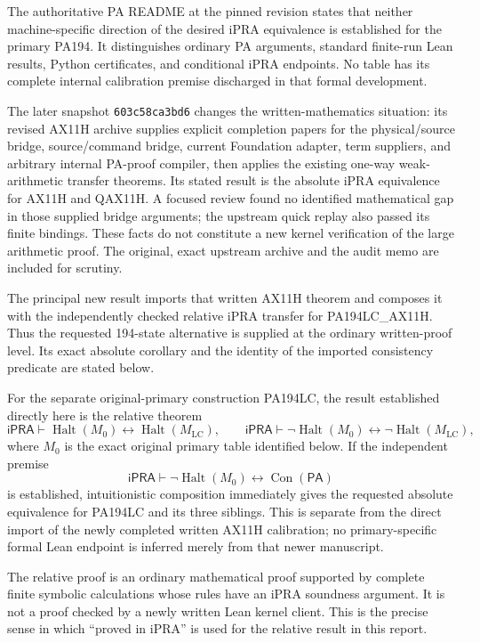 \documentclass[11pt,a4paper]{article}
\newcommand{\ipra}{\mathsf{iPRA}}
\newcommand{\pa}{\mathsf{PA}}
\newcommand{\Con}{\operatorname{Con}}
\newcommand{\Halt}{\operatorname{Halt}}
\newcommand{\ML}{M_{\mathrm{LC}}}
\begin{document}
The authoritative PA README at the pinned revision states that neither
machine-specific direction of the desired iPRA equivalence is established
for the primary PA194. It distinguishes ordinary PA arguments, standard
finite-run Lean results, Python certificates, and conditional iPRA
endpoints. No table has its complete internal calibration premise
discharged in that formal development.\cite{pa-readme}

The later snapshot \texttt{603c58ca3bd6} changes the written-mathematics
situation: its revised AX11H archive supplies explicit completion papers
for the physical/source bridge, source/command bridge, current Foundation
adapter, term suppliers, and arbitrary internal PA-proof compiler, then
applies the existing one-way weak-arithmetic transfer theorems.
Its stated result is the absolute iPRA equivalence for AX11H and
QAX11H.\cite{latest-ax11h} A focused review found no identified mathematical
gap in those supplied bridge arguments; the upstream quick replay also
passed its finite bindings. These facts do not constitute a new kernel
verification of the large arithmetic proof. The original, exact upstream
archive and the audit memo are included for scrutiny.

The principal new result imports that written AX11H theorem and composes
it with the independently checked relative iPRA transfer for
PA194LC\_AX11H. Thus the requested 194-state alternative is supplied at
the ordinary written-proof level. Its exact absolute corollary and the
identity of the imported consistency predicate are stated below.

For the separate original-primary construction PA194LC, the result
established directly here is the relative theorem
\[
\ipra\vdash\Halt(M_0)\leftrightarrow\Halt(\ML),
\qquad
\ipra\vdash\neg\Halt(M_0)\leftrightarrow\neg\Halt(\ML),
\]
where $M_0$ is the exact original primary table identified below. If the independent
premise
\[
\ipra\vdash\neg\Halt(M_0)\leftrightarrow\Con(\pa)
\tag{Calibration}
\]
is established, intuitionistic composition immediately gives the requested
absolute equivalence for PA194LC and its three siblings. This is separate
from the direct import of the newly completed written AX11H calibration;
no primary-specific formal Lean endpoint is inferred merely from that
newer manuscript.

The relative proof is an ordinary mathematical proof supported by complete
finite symbolic calculations whose rules have an iPRA soundness argument.
It is not a proof checked by a newly written Lean kernel client. This is
the precise sense in which ``proved in iPRA'' is used for the relative
result in this report.
\end{document}
